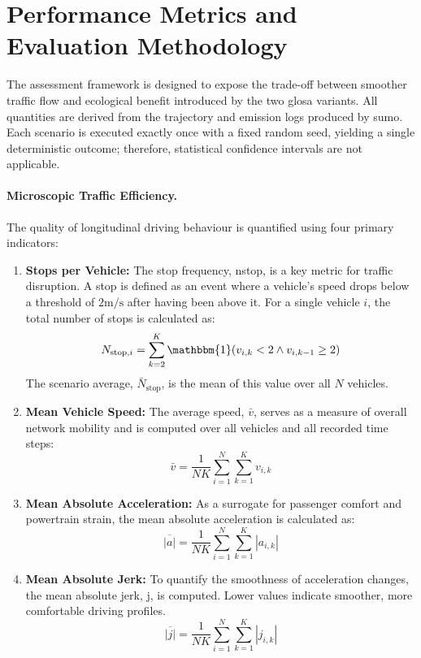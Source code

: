 \section{Performance Metrics and Evaluation Methodology}
\label{sec:performance_evaluation}

The assessment framework is designed to expose the trade-off between smoother traffic flow and ecological benefit introduced by the two \ac{glosa} variants. All quantities are derived from the trajectory and emission logs produced by \ac{sumo}. Each scenario is executed exactly once with a fixed random seed, yielding a single deterministic outcome; therefore, statistical confidence intervals are not applicable.

\paragraph{Microscopic Traffic Efficiency.}
The quality of longitudinal driving behaviour is quantified using four primary indicators:

\begin{enumerate}[label=\textbf{(\roman*)}]
    \item \textbf{Stops per Vehicle:} The stop frequency, \gls{nstop}, is a key metric for traffic disruption. A stop is defined as an event where a vehicle's speed drops below a threshold of $2\unit{\metre\per\second}$ after having been above it. For a single vehicle $i$, the total number of stops is calculated as:
    \begin{equation}
        N_{\mathrm{stop},i} = \sum_{k=2}^{K}{\mathbbm{1}}(v_{i,k} < 2 \land v_{i,k-1} \ge 2)
    \end{equation}
    The scenario average, $\bar{N}_{\mathrm{stop}}$, is the mean of this value over all $N$ vehicles.

    \item \textbf{Mean Vehicle Speed:} The average speed, $\bar{v}$, serves as a measure of overall network mobility and is computed over all vehicles and all recorded time steps:
    \begin{equation}
        \bar{v} = \frac{1}{NK}\sum_{i=1}^{N}\sum_{k=1}^{K} v_{i,k}
    \end{equation}

    \item \textbf{Mean Absolute Acceleration:} As a surrogate for passenger comfort and powertrain strain, the mean absolute acceleration is calculated as:
    \begin{equation}
        \overline{|a|} = \frac{1}{NK}\sum_{i=1}^{N}\sum_{k=1}^{K} |a_{i,k}|
    \end{equation}

    \item \textbf{Mean Absolute Jerk:} To quantify the smoothness of acceleration changes, the mean absolute jerk, \gls{j}, is computed. Lower values indicate smoother, more comfortable driving profiles.
    \begin{equation}
        \overline{|j|} = \frac{1}{NK}\sum_{i=1}^{N}\sum_{k=1}^{K} |j_{i,k}|
    \end{equation}
\end{enumerate}

